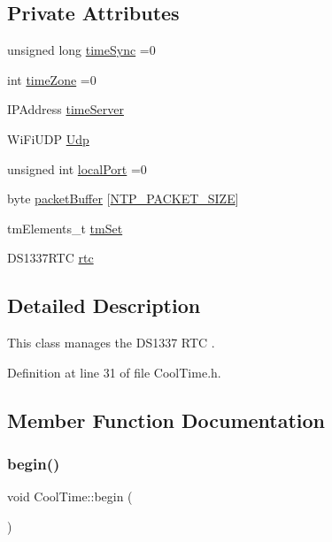 \subsection*{Private Attributes}
\begin{DoxyCompactItemize}
\item 
unsigned long \hyperlink{classCoolTime_a9d032e76c3470a15b3bbbc52af6463f7}{time\+Sync} =0
\item 
int \hyperlink{classCoolTime_a1916d98810c2a4e9ba72867e8c1b9a99}{time\+Zone} =0
\item 
I\+P\+Address \hyperlink{classCoolTime_ad2b9858f399108cb440dd1e908916f04}{time\+Server}
\item 
Wi\+Fi\+U\+DP \hyperlink{classCoolTime_a4e23216a8121ca79d0fb019f30884b92}{Udp}
\item 
unsigned int \hyperlink{classCoolTime_a2f777da44d7ba678be8185299e9b49d1}{local\+Port} =0
\item 
byte \hyperlink{classCoolTime_a27e6abc82a5c2f72161956967005bec7}{packet\+Buffer} \mbox{[}\hyperlink{CoolTime_8h_a56a6ea64006651b4f42adf713e244f06}{N\+T\+P\+\_\+\+P\+A\+C\+K\+E\+T\+\_\+\+S\+I\+ZE}\mbox{]}
\item 
tm\+Elements\+\_\+t \hyperlink{classCoolTime_ad33c2713c903ff064ad09c46406ae088}{tm\+Set}
\item 
D\+S1337\+R\+TC \hyperlink{classCoolTime_abd38f2384ff90692b1568d9db869412e}{rtc}
\end{DoxyCompactItemize}


\subsection{Detailed Description}
This class manages the D\+S1337 R\+TC . 

Definition at line 31 of file Cool\+Time.\+h.



\subsection{Member Function Documentation}
\mbox{\label{classCoolTime_ab1976cf718b950bc31e003c3323b8adb}} 
\subsubsection{\texorpdfstring{begin()}{begin()}}
{\footnotesize\ttfamily void Cool\+Time\+::begin (\begin{DoxyParamCaption}{ }\end{DoxyParamCaption})}

